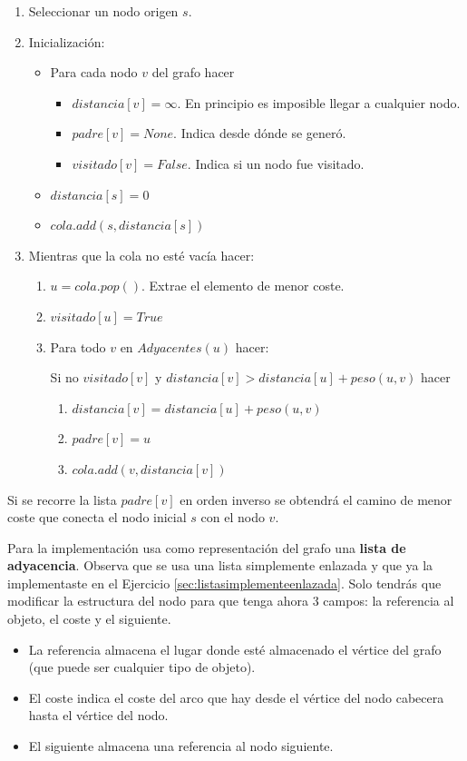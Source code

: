 \begin{enumerate}
\item Seleccionar un nodo origen $s$.
\item Inicialización: 
	\begin{itemize}
	\item Para cada nodo $v$ del grafo hacer
	\begin{itemize}
	\item $distancia[v]=\infty$. En principio es imposible llegar a cualquier nodo.
	\item $padre[v]=None$. Indica desde dónde se generó.
	\item $visitado[v]=False$. Indica si un nodo fue visitado.
	\end{itemize}
	
	\item $distancia[s]=0$
	\item $cola.add(s, distancia[s])$
	\end{itemize}
	
\item Mientras que la cola no esté vacía hacer:
	\begin{enumerate}
	\item $u=cola.pop()$. Extrae el elemento de menor coste.
	\item $visitado[u]=True$
	\item Para todo $v$ en $Adyacentes(u)$ hacer:
		
		Si no $visitado[v]$ y $distancia[v]>distancia[u]+peso(u, v)$ hacer
			\begin{enumerate}
			\item $distancia[v] = distancia[u]+peso(u, v)$
			\item $padre[v]=u$
			\item  $cola.add(v, distancia[v])$
			\end{enumerate}

	\end{enumerate}
\end{enumerate}

Si se recorre la lista $padre[v]$ en orden inverso se obtendrá el camino de menor coste que conecta el nodo inicial $s$ con el nodo $v$.

Para la implementación usa como representación del grafo una \textbf{lista de adyacencia}. Observa que se usa una lista simplemente enlazada y que ya la implementaste en el Ejercicio \ref{sec:listasimplementeenlazada}. Solo tendrás que modificar la estructura del nodo para que tenga ahora 3 campos: la referencia al objeto, el coste y el siguiente. 		\begin{itemize}
	\item La referencia almacena el lugar donde esté almacenado el vértice del grafo (que puede ser cualquier tipo de objeto).	
	\item El coste  indica el coste del arco que hay desde el vértice del nodo cabecera hasta el vértice del nodo.
	\item El siguiente almacena una referencia al nodo siguiente.
	\end{itemize}
	
